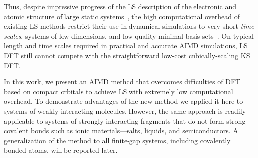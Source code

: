 \documentclass[aip,jcp,reprint,amsmath,amssymb]{revtex4-1}
\begin{document}

Thus, despite impressive progress of the LS description of the electronic and atomic structure of large static systems~\cite{Bowler2010,a:ls-dm-sign}, the high computational overhead of existing LS methods restrict their use in dynamical simulations to very short \emph{time scales}, systems of low dimensions, and low-quality minimal basis sets~\cite{a:ls-dm-sign, Otsuka2016, Hine2011, Bowler2010}. 
On typical length and time scales required in practical and accurate AIMD simulations, LS DFT still cannot compete with the straightforward low-cost cubically-scaling KS DFT.

In this work, we present an AIMD method that overcomes difficulties of DFT based on compact orbitals to achieve LS with extremely low computational overhead. 
To demonstrate advantages of the new method we applied it here to systems of weakly-interacting molecules. 
However, the same approach is readily applicable to systems of strongly-interacting fragments that do not form strong covalent bonds such as ionic materials---salts, liquids, and semiconductors. 
A generalization of the method to all finite-gap systems, including covalently bonded atoms, will be reported later. 
\end{document}
